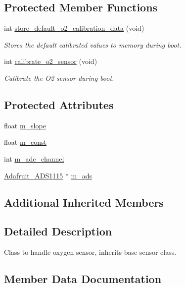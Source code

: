 \subsection*{Protected Member Functions}
\begin{DoxyCompactItemize}
\item 
int \hyperlink{group___ventilator_module_gabdf47205921998912383bd108cc1c417}{store\+\_\+default\+\_\+o2\+\_\+calibration\+\_\+data} (void)
\begin{DoxyCompactList}\small\item\em Stores the default calibrated values to memory during boot. \end{DoxyCompactList}\item 
int \hyperlink{group___ventilator_module_gaec727276605d9fef106d5115f711c037}{calibrate\+\_\+o2\+\_\+sensor} (void)
\begin{DoxyCompactList}\small\item\em Calibrate the O2 sensor during boot. \end{DoxyCompactList}\end{DoxyCompactItemize}
\subsection*{Protected Attributes}
\begin{DoxyCompactItemize}
\item 
float \hyperlink{classo2__sensor_ae64844128c35556e8b5c26d025923640}{m\+\_\+slope}
\item 
float \hyperlink{classo2__sensor_afce94a82b320a6de471ccbdba88215dd}{m\+\_\+const}
\item 
int \hyperlink{classo2__sensor_adcf162976b67d9989df40adcf55ff26e}{m\+\_\+adc\+\_\+channel}
\item 
\hyperlink{class_adafruit___a_d_s1115}{Adafruit\+\_\+\+A\+D\+S1115} $\ast$ \hyperlink{classo2__sensor_a3287c965f7e5fa40e01cf0f5441cd542}{m\+\_\+ads}
\end{DoxyCompactItemize}
\subsection*{Additional Inherited Members}


\subsection{Detailed Description}
Class to handle oxygen sensor, inherits base sensor class. 

\subsection{Member Data Documentation}
\mbox{\label{classo2__sensor_adcf162976b67d9989df40adcf55ff26e}} 
